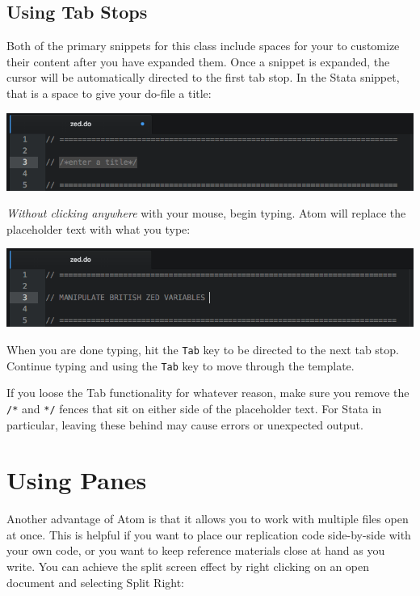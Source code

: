 \documentclass[]{book}
\theoremstyle{definition}
\theoremstyle{definition}
\theoremstyle{remark}
\begin{document}
\subsection{Using Tab Stops}\label{using-tab-stops}

Both of the primary snippets for this class include spaces for your to
customize their content after you have expanded them. Once a snippet is
expanded, the cursor will be automatically directed to the first tab
stop. In the Stata snippet, that is a space to give your do-file a
title:

\includegraphics[width=1\linewidth]{images/atomHead}

\emph{Without clicking anywhere} with your mouse, begin typing. Atom
will replace the placeholder text with what you type:

\includegraphics[width=1\linewidth]{images/atomHead2}

When you are done typing, hit the \texttt{Tab} key to be directed to the
next tab stop. Continue typing and using the \texttt{Tab} key to move
through the template.

If you loose the Tab functionality for whatever reason, make sure you
remove the \texttt{/*} and \texttt{*/} fences that sit on either side of
the placeholder text. For Stata in particular, leaving these behind may
cause errors or unexpected output.

\section{Using Panes}\label{using-panes}

Another advantage of Atom is that it allows you to work with multiple
files open at once. This is helpful if you want to place our replication
code side-by-side with your own code, or you want to keep reference
materials close at hand as you write. You can achieve the split screen
effect by right clicking on an open document and selecting Split Right:
\end{document}
